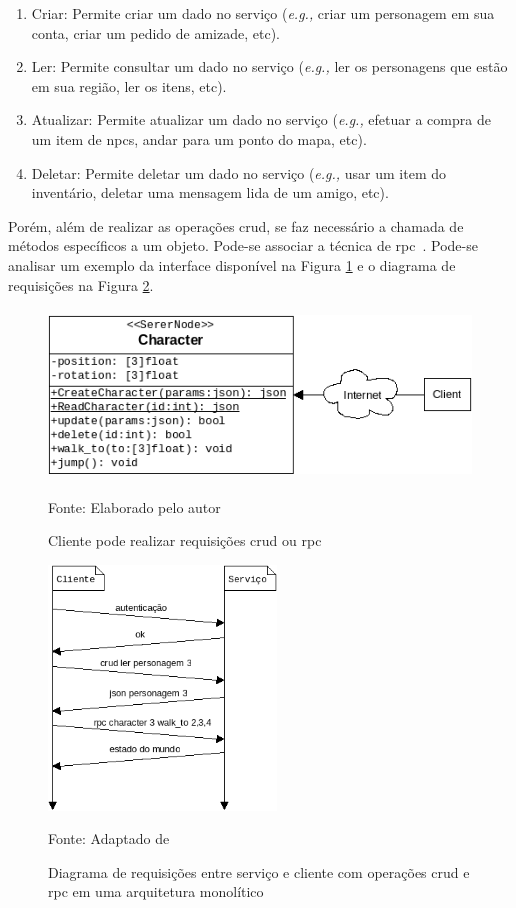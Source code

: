 \begin{enumerate}
  \item Criar: Permite criar um dado no serviço (\textit{e.g.,} criar um personagem em sua conta, criar um pedido de amizade, etc).
  \item Ler: Permite consultar um dado no serviço (\textit{e.g.,} ler os personagens que estão em sua região, ler os itens, etc).
  \item Atualizar: Permite atualizar um dado no serviço (\textit{e.g.,} efetuar a compra de um item de \ac{npcs}, andar para um ponto do mapa, etc).
  \item Deletar: Permite deletar um dado no serviço (\textit{e.g.,} usar um item do inventário, deletar uma mensagem lida de um amigo, etc).
\end{enumerate}



Porém, além de realizar as operações \ac{crud}, se faz necessário a chamada de métodos específicos a um objeto.
%
Pode-se associar a técnica de \ac{rpc}~\cite{LeckyThompson2008Nov}. Pode-se analisar um exemplo da interface disponível na Figura \ref{fig:crud_rpc} e o diagrama de requisições na Figura \ref{fig:network_crud_rpc}.



\begin{figure}[htb!]
\caption{Cliente pode realizar requisições \ac{crud} ou \ac{rpc}}
\label{fig:crud_rpc}
\includegraphics[height=4.5cm]{img/cap2/crud_rpc.png}
\centering

Fonte: Elaborado pelo autor
\end{figure}



\begin{figure}[htb!]
\caption{Diagrama de requisições entre serviço e cliente com operações \ac{crud} e \ac{rpc} em uma arquitetura monolítico}
\label{fig:network_crud_rpc}
\includegraphics[height=6.5cm]{img/cap2/network_rpc_crud.png}
\centering

Fonte: Adaptado de~\cite{LeckyThompson2008Nov}
\end{figure}



